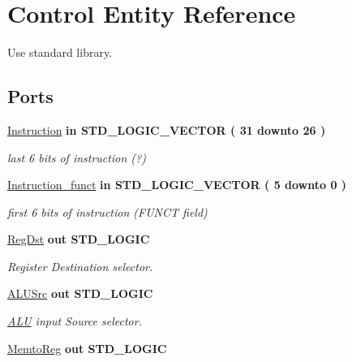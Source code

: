 \hypertarget{class_control}{\section{\-Control \-Entity \-Reference}
\label{class_control}
}


\-Use standard library.  


\*
\*
\subsection*{\-Ports}
 \begin{DoxyCompactItemize}
\item 
\hyperlink{class_control_a35120c002e477a6e77c738ea1aaa5505}{\-Instruction}  {\bfseries {\bfseries in }} {\bfseries \-S\-T\-D\-\_\-\-L\-O\-G\-I\-C\-\_\-\-V\-E\-C\-T\-O\-R (   31    downto    26  ) } 
\begin{DoxyCompactList}\small\item\em last 6 bits of instruction (?) \end{DoxyCompactList}\item 
\hyperlink{class_control_a837426aa7a23a4b3f1534d7a5a47fd84}{\-Instruction\-\_\-funct}  {\bfseries {\bfseries in }} {\bfseries \-S\-T\-D\-\_\-\-L\-O\-G\-I\-C\-\_\-\-V\-E\-C\-T\-O\-R (   5    downto    0  ) } 
\begin{DoxyCompactList}\small\item\em first 6 bits of instruction (\-F\-U\-N\-C\-T field) \end{DoxyCompactList}\item 
\hyperlink{class_control_a3e8450f5ca7972a364f6eaffec9c86a2}{\-Reg\-Dst}  {\bfseries {\bfseries out }} {\bfseries \-S\-T\-D\-\_\-\-L\-O\-G\-I\-C } 
\begin{DoxyCompactList}\small\item\em \-Register \-Destination selector. \end{DoxyCompactList}\item 
\hyperlink{class_control_aec5087b6dc490446af52e39d0264cf50}{\-A\-L\-U\-Src}  {\bfseries {\bfseries out }} {\bfseries \-S\-T\-D\-\_\-\-L\-O\-G\-I\-C } 
\begin{DoxyCompactList}\small\item\em \hyperlink{class_a_l_u}{\-A\-L\-U} input \-Source selector. \end{DoxyCompactList}\item 
\hyperlink{class_control_ae18caf473070cf8e735d12ca860fb762}{\-Memto\-Reg}  {\bfseries {\bfseries out }} {\bfseries \-S\-T\-D\-\_\-\-L\-O\-G\-I\-C } 

\end{DoxyCompactItemize}
